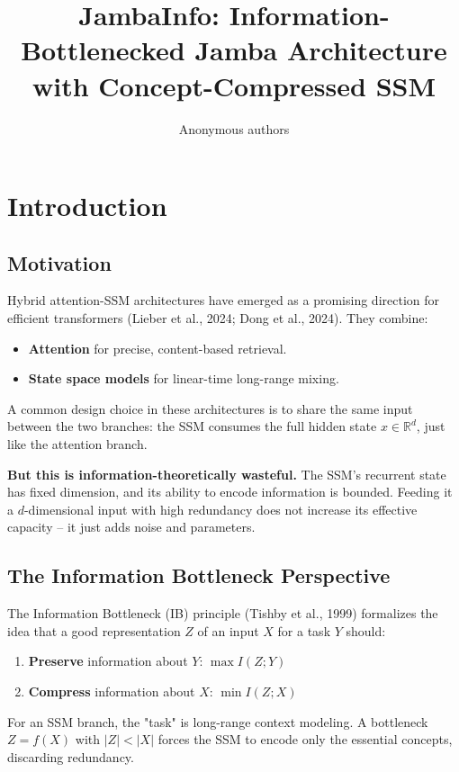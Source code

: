 \title{\textbf{JambaInfo: Information-Bottlenecked Jamba Architecture with Concept-Compressed SSM}}

\author{Anonymous authors}


\section{Introduction}

\subsection{Motivation}

Hybrid attention-SSM architectures have emerged as a promising direction for 
efficient transformers (Lieber et al., 2024; Dong et al., 2024). They 
combine:

\begin{itemize}
\item \textbf{Attention} for precise, content-based retrieval.
\item \textbf{State space models} for linear-time long-range mixing.

\end{itemize}
A common design choice in these architectures is to share the same input 
between the two branches: the SSM consumes the full hidden state 
$x \in \mathbb{R}^d$, just like the attention branch.

\textbf{But this is information-theoretically wasteful.} The SSM's recurrent 
state has fixed dimension, and its ability to encode information is bounded. 
Feeding it a $d$-dimensional input with high redundancy does not increase 
its effective capacity -- it just adds noise and parameters.

\subsection{The Information Bottleneck Perspective}

The Information Bottleneck (IB) principle (Tishby et al., 1999) formalizes 
the idea that a good representation $Z$ of an input $X$ for a task $Y$ 
should:

\begin{enumerate}
\item \textbf{Preserve} information about $Y$: $\max I(Z; Y)$
\item \textbf{Compress} information about $X$: $\min I(Z; X)$

\end{enumerate}
For an SSM branch, the "task" is long-range context modeling. A bottleneck 
$Z = f(X)$ with $|Z| < |X|$ forces the SSM to encode only the essential 
concepts, discarding redundancy.

